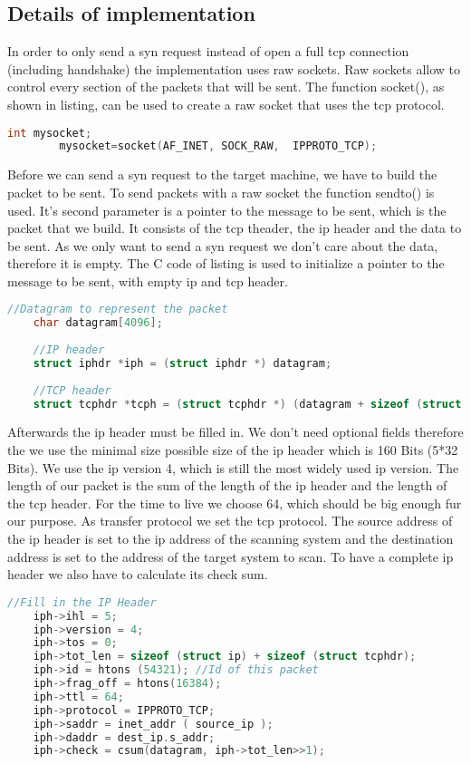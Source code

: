 \documentclass[a4paper]{scrartcl}
\begin{document}
	
	
	\subsection{Details of implementation}
	In order to only send a syn request instead of open a full tcp connection (including handshake) the implementation uses raw sockets. Raw sockets allow to control
	every section of the packets that will be sent. The function socket(), as shown in listing, can be used to create a raw socket that uses the tcp protocol.
	\begin{lstlisting}[frame= single, language=C, caption= C code to use the connect() to check if port is open]
		int mysocket;
		mysocket=socket(AF_INET, SOCK_RAW,  IPPROTO_TCP);
	\end{lstlisting}
	Before we can send a syn request to the target machine, we have to build the packet to be sent. To send packets with a raw socket the function sendto() is used.
	It's second parameter is a pointer to the message to be sent, which 
	is the packet that we build. It consists of the tcp theader, the ip header and the data
	to be sent. As we only want to send a syn request we don't care about the data, therefore it is empty. The C code of listing is used to initialize a pointer to the message
	to be sent, with empty ip and tcp header.
	\begin{lstlisting}[frame= single, language=C, caption= C code to use the connect() to check if port is open]
	//Datagram to represent the packet
	char datagram[4096];    
	
	//IP header
	struct iphdr *iph = (struct iphdr *) datagram;
	
	//TCP header
	struct tcphdr *tcph = (struct tcphdr *) (datagram + sizeof (struct ip));
	\end{lstlisting}
	Afterwards the ip header must be filled in. We don't need optional fields therefore the we use the minimal size possible size of the ip header which is 160 Bits (5*32 Bits). We use the ip version 4, which is still the most widely used ip version. The length of our packet
	is the sum of the length of the ip header and the length of the tcp header. For the time to live we choose 64, which should be big enough
	fur our purpose. As transfer protocol we set the tcp protocol. The source address of the ip header is set to the ip address of the scanning system and the destination address is set to the address of the target system to scan. To have a complete ip header we also
	have to calculate its check sum.
	\begin{lstlisting}[frame= single, language=C, caption= C code to fill in ip header]
	//Fill in the IP Header
	iph->ihl = 5;
	iph->version = 4;
	iph->tos = 0;
	iph->tot_len = sizeof (struct ip) + sizeof (struct tcphdr);
	iph->id = htons (54321); //Id of this packet
	iph->frag_off = htons(16384);
	iph->ttl = 64;
	iph->protocol = IPPROTO_TCP;
	iph->saddr = inet_addr ( source_ip );   
	iph->daddr = dest_ip.s_addr;
	iph->check = csum(datagram, iph->tot_len>>1);
	\end{lstlisting}
\end{document}
